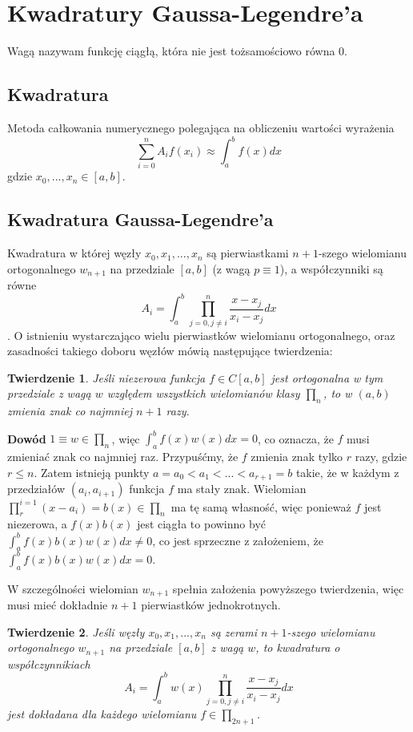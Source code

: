 \documentclass{article}
\newtheorem{theorem}{Twierdzenie}
\begin{document}
\section*{Kwadratury Gaussa-Legendre'a}
	Wagą nazywam funkcję ciągłą, która nie jest tożsamościowo równa 0.
\subsection*{Kwadratura} 
Metoda całkowania numerycznego polegająca na obliczeniu wartości wyrażenia
\[ \sum_{i=0}^n A_if(x_i) \approx \int_a^b f(x) d x \] 
gdzie $x_0,...,x_n\in [a,b]$.

\subsection*{Kwadratura Gaussa-Legendre'a}
Kwadratura w której węzły $x_0,x_1,...,x_n$ są pierwiastkami $n+1$-szego
wielomianu ortogonalnego $w_{n+1}$ na przedziale $[a,b]$ (z wagą $p\equiv 1$), a współczynniki są równe
\[A_i=\int_a^b \prod_{j=0,j\neq i}^n \frac{x-x_j}{x_i-x_j} dx\]. O istnieniu
wystarczająco wielu pierwiastków wielomianu ortogonalnego, oraz zasadności 
takiego doboru węzłów mówią następujące twierdzenia: 
\begin{theorem}
	Jeśli niezerowa funkcja $f\in C[a,b]$ jest ortogonalna w tym przedziale z wagą $w$ względem wszystkich wielomianów klasy $\prod_{n}$, to w $(a,b)$ zmienia znak co najmniej $n+1$ razy.
\end{theorem}
\textbf{Dowód} $1\equiv w \in \prod_{n}$, więc $\int_a^b f(x)w(x)dx = 0$, co oznacza, że $f$ musi zmieniać znak co najmniej raz. Przypuśćmy, że $f$ zmienia znak tylko $r$ razy, gdzie $r\le n $. Zatem istnieją punkty $a=a_0<a_1<...<a_{r+1}=b$ takie, że w każdym z przedziałów $(a_i,a_{i+1})$ funkcja $f$ ma stały znak. Wielomian $\prod_{r}^{i=1}(x-a_i) = b(x) \in \prod_{n}$ ma tę samą własność, więc ponieważ $f$ jest niezerowa, a $f(x)b(x)$ jest ciągła to powinno być $\int_{a}^{b} f(x)b(x)w(x)dx\neq 0$, co jest sprzeczne z założeniem, że $\int_{a}^{b}f(x)b(x)w(x)dx = 0$. \newline

W szczególności wielomian $w_{n+1}$ spełnia założenia powyższego twierdzenia, więc musi mieć dokładnie $n+1$ pierwiastków jednokrotnych.

\begin{theorem}
	Jeśli węzły $x_0,x_1,...,x_n$ są zerami $n+1$-szego wielomianu ortogonalnego $w_{n+1}$ na przedziale $[a,b]$ z wagą $w$, to kwadratura o współczynnikiach
	\[A_i=\int_a^b w(x)\prod_{j=0,j\neq i}^n \frac{x-x_j}{x_i-x_j} dx\] jest dokładana dla każdego wielomianu $f\in\prod_{2n+1}$.
\end{theorem}
\end{document}
